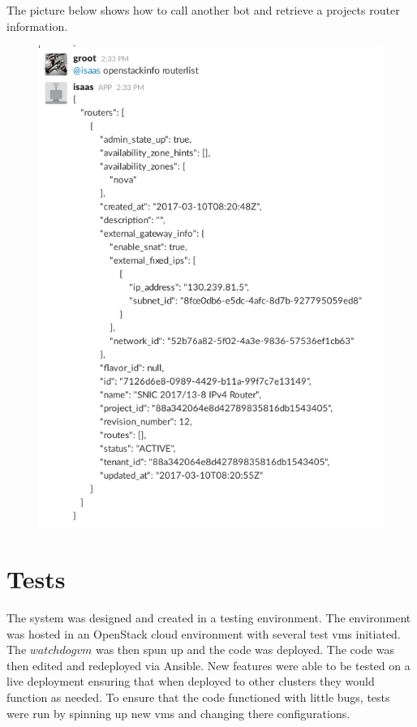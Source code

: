 \documentclass[12pt]{article}
\begin{document}
The picture below shows how to call another bot and retrieve a projects router information.
\begin{figure}[H]
    \begin{mdframed}
    \includegraphics[scale=.5]{./pic/2017-06-26-113808_563x789_scrot.png}
    \end{mdframed}
\end{figure}

\section{Tests}
The system was designed and created in a testing environment. The environment was hosted in an OpenStack cloud environment with several test vms initiated. The $watchdog vm$ was then spun up and the code was deployed. The code was then edited and redeployed via Ansible. New features were able to be tested on a live deployment ensuring that when deployed to other clusters they would function as needed. To ensure that the code functioned with little bugs, tests were run by spinning up new vms and changing there configurations.
\end{document}
